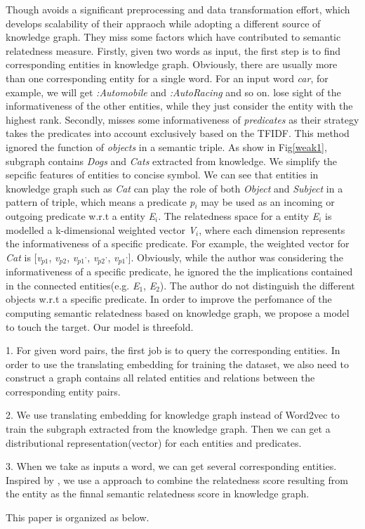 Though \cite{aaai/Pirro12} avoids a significant preprocessing and data
transformation effort, which develops scalability of their appraoch while adopting a
different source of knowledge graph. They miss some factors which
have contributed to semantic relatedness measure. Firstly, given two words
as input, the first step is to find corresponding entities in knowledge
graph. Obviously, there are usually more than one corresponding entity for a single word.
For an input word \emph{car}, for example, we will get \emph{:Automobile} and
\emph{:Auto\underline{\hspace{0.5em}}Racing} and so on. \cite{aaai/Pirro12} lose
sight of the informativeness of the other entities, while they just
consider the entity with the highest rank. Secondly, \cite{aaai/Pirro12} misses
some informativeness of \emph{predicates} as their strategy takes
the predicates into account exclusively based on the TFIDF. This
method ignored the function of \emph{objects} in a semantic triple.
As show in Fig\ref{weak1}, subgraph contains \emph{Dogs} and \emph{Cats} extracted from
knowledge. We simplify the sepcific features of entities to concise symbol. 
We can see that entities in knowledge graph such as \emph{Cat} can play the role 
of both \emph{Object} and \emph{Subject} in a pattern of triple, which means a predicate 
\emph{p$_i$} may be used as an incoming or outgoing predicate w.r.t a entity
\emph{E$_i$}. The relatedness space for a entity \emph{E$_i$} is modelled a 
k-dimensional weighted vector \emph{V$_i$}, where each dimension represents
the informativeness of a specific predicate\cite{BudanitskyH06}. For example, the weighted
vector for \emph{Cat} is 
[\emph{v$_{p1}$}, \emph{v$_{p2}$}, \emph{v$_{p1}$$^,$}, \emph{v$_{p2}$$^,$}, \emph{v$_{p1}$$^,$}]. 
Obviously, while the author was considering the informativeness of a specific 
predicate, he ignored the the implications contained in the connected entities(e.g.
\emph{E$_1$}, \emph{E$_2$}). The author do not distinguish the different 
objects w.r.t a specific predicate. In order to improve the perfomance of the computing
semantic relatedness based on knowledge graph, we propose a model to touch 
the target. Our model is threefold.

1. For given word pairs, the first job is to query
the corresponding entities. In order to use the
translating embedding for training the dataset, we
also need to construct a graph contains all related
entities and relations between the corresponding
entity pairs.

2. We use translating embedding for knowledge
graph instead of Word2vec to train the subgraph
extracted from the knowledge graph. Then we can
get a distributional representation(vector) for each
entities and predicates. 

3. When we take as inputs a word, we can get several 
corresponding entities. Inspired by \cite{acl/IacobacciPN15}, we use 
a approach to combine the relatedness score resulting from the
entity as the finnal semantic relatedness score in knowledge graph.

This paper is organized as below. 